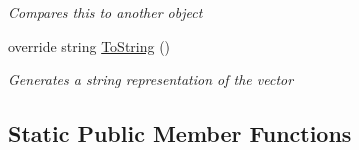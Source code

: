\begin{DoxyCompactItemize}
\begin{DoxyCompactList}\small\item\em Compares this to another object \end{DoxyCompactList}\item 
override string \mbox{\hyperlink{struct_eagle_eye_1_1_models_1_1_geometry_1_1_vector2_ad6c5d2e69555886b7f9bbd56f814a908}{To\+String}} ()
\begin{DoxyCompactList}\small\item\em Generates a string representation of the vector \end{DoxyCompactList}\end{DoxyCompactItemize}
\subsection*{Static Public Member Functions}
